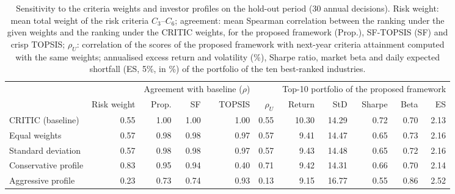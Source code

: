 \begin{table}[!htbp]
\centering
\scriptsize
\caption{Sensitivity to the criteria weights and investor profiles on the hold-out period (30 annual decisions). Risk weight: mean total weight of the risk criteria $C_3$--$C_6$; agreement: mean Spearman correlation between the ranking under the given weights and the ranking under the CRITIC weights, for the proposed framework (Prop.), SF-TOPSIS (SF) and crisp TOPSIS; $\rho_U$: correlation of the scores of the proposed framework with next-year criteria attainment computed with the same weights; annualised excess return and volatility (\%), Sharpe ratio, market beta and daily expected shortfall (ES, 5\%, in \%) of the portfolio of the ten best-ranked industries.}\label{tab:weights}
\begin{adjustbox}{max width=\textwidth}
\begin{tabular}{lrrrrrrrrrr}
\toprule
 & & \multicolumn{3}{c}{Agreement with baseline ($\rho$)} & & \multicolumn{5}{c}{Top-10 portfolio of the proposed framework}\\
\cmidrule(lr){3-5}\cmidrule(lr){7-11}
 & Risk weight & Prop. & SF & TOPSIS & $\rho_U$ & Return & StD & Sharpe & Beta & ES \\
\midrule
CRITIC (baseline) & 0.55 & 1.00 & 1.00 & 1.00 & 0.55 & 10.30 & 14.29 & 0.72 & 0.70 & 2.13 \\
Equal weights & 0.57 & 0.98 & 0.98 & 0.97 & 0.57 & 9.41 & 14.47 & 0.65 & 0.73 & 2.16 \\
Standard deviation & 0.57 & 0.98 & 0.98 & 0.97 & 0.57 & 9.43 & 14.48 & 0.65 & 0.72 & 2.16 \\
Conservative profile & 0.83 & 0.95 & 0.94 & 0.40 & 0.71 & 9.42 & 14.31 & 0.66 & 0.70 & 2.14 \\
Aggressive profile & 0.23 & 0.73 & 0.74 & 0.93 & 0.13 & 9.15 & 16.77 & 0.55 & 0.86 & 2.52 \\
\bottomrule
\end{tabular}
\end{adjustbox}
\end{table}

